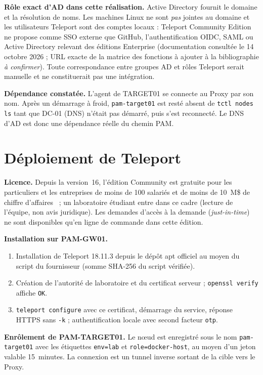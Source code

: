 \documentclass[11pt,a4paper]{report}
\newcommand{\aconf}{\emph{à confirmer}}
\begin{document}
\textbf{Rôle exact d'AD dans cette réalisation.} Active Directory fournit le domaine et la résolution de noms. Les machines Linux ne sont \emph{pas} jointes au domaine et les utilisateurs Teleport sont des comptes locaux : Teleport Community Edition ne propose comme SSO externe que GitHub, l'authentification OIDC, SAML ou Active Directory relevant des éditions Enterprise (documentation consultée le 14 octobre 2026 ; URL exacte de la matrice des fonctions à ajouter à la bibliographie \aconf). Toute correspondance entre groupes AD et rôles Teleport serait manuelle et ne constituerait pas une intégration.

\textbf{Dépendance constatée.} L'agent de TARGET01 se connecte au Proxy par son nom. Après un démarrage à froid, \texttt{pam-target01} est resté absent de \texttt{tctl nodes ls} tant que DC-01 (DNS) n'était pas démarré, puis s'est reconnecté. Le DNS d'AD est donc une dépendance réelle du chemin PAM.

\section{Déploiement de Teleport}
\textbf{Licence.} Depuis la version~16, l'édition Community est gratuite pour les particuliers et les entreprises de moins de 100 salariés et de moins de 10~M\$ de chiffre d'affaires~\cite{tp-licence} ; un laboratoire étudiant entre dans ce cadre (lecture de l'équipe, non avis juridique). Les demandes d'accès à la demande (\emph{just-in-time}) ne sont disponibles qu'en ligne de commande dans cette édition.

\textbf{Installation sur PAM-GW01.}
\begin{enumerate}
\item Installation de Teleport 18.11.3 depuis le dépôt apt officiel au moyen du script du fournisseur (somme SHA-256 du script vérifiée).
\item Création de l'autorité de laboratoire et du certificat serveur ; \texttt{openssl verify} affiche \texttt{OK}.
\item \texttt{teleport configure} avec ce certificat, démarrage du service, réponse HTTPS sans \texttt{-k} ; authentification locale avec second facteur \texttt{otp}.
\end{enumerate}

\textbf{Enrôlement de PAM-TARGET01.} Le nœud est enregistré sous le nom \texttt{pam-target01} avec les étiquettes \texttt{env=lab} et \texttt{role=docker-host}, au moyen d'un jeton valable 15~minutes. La connexion est un tunnel inverse sortant de la cible vers le Proxy.
\end{document}
